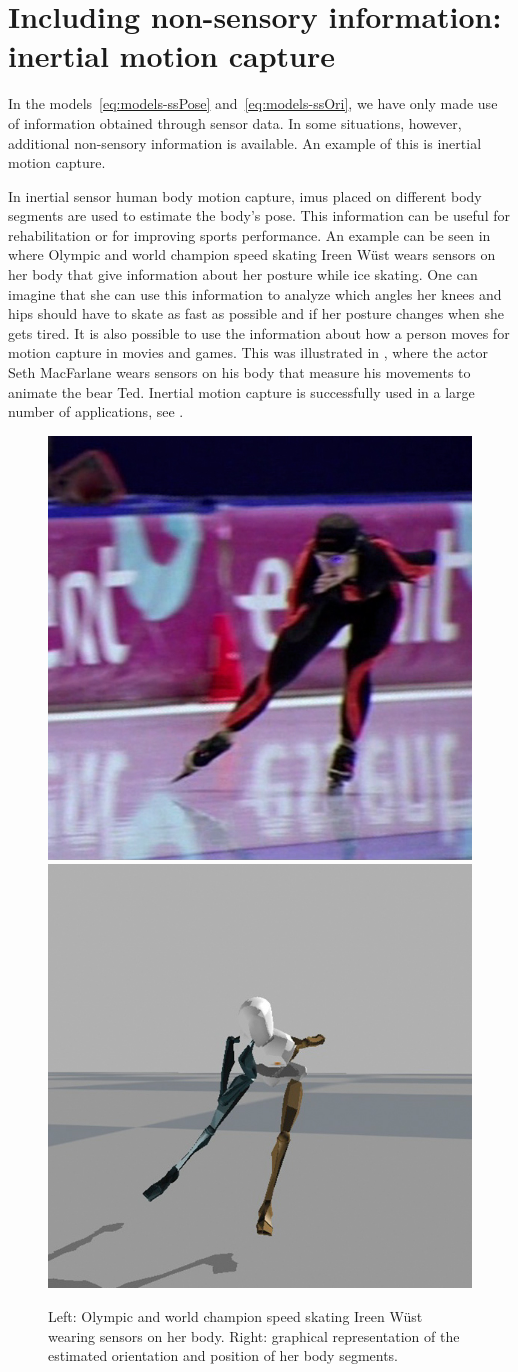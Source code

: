 \section{Including non-sensory information: inertial motion capture}
\label{sec:appl-motionCapture}
In the models~\eqref{eq:models-ssPose} and~\eqref{eq:models-ssOri}, we have only made use of information obtained through sensor data. In some situations, however, additional non-sensory information is available. An example of this is inertial motion capture. 

In inertial sensor human body motion capture, \glspl{imu} placed on different body segments are used to estimate the body's pose. This information can be useful for rehabilitation or for improving sports performance. An example can be seen in  where Olympic and world champion speed skating Ireen W\"ust wears sensors on her body that give information about her posture while ice skating. One can imagine that she can use this information to analyze which angles her knees and hips should have to skate as fast as possible and if her posture changes when she gets tired. It is also possible to use the information about how a person moves for motion capture in movies and games. This was illustrated in , where the actor Seth MacFarlane wears sensors on his body that measure his movements to animate the bear Ted. Inertial motion capture is successfully used in a large number of applications, see \eg \cite{roetenbergLS:2013,kangJPK:2011,yunB:2006}. 

\begin{figure}
  \centering
  	\includegraphics[width = 0.3\columnwidth]{figure6_4a}
	\includegraphics[width = 0.3\columnwidth]{figure6_4b}
	\label{fig:kappa-intro-applications-wust} 
  \caption{Left: Olympic and world champion speed skating Ireen W\"ust wearing sensors on her body. Right: graphical representation of the estimated orientation and position of her body segments.}
  \label{fig:appl-wust}
\end{figure}

